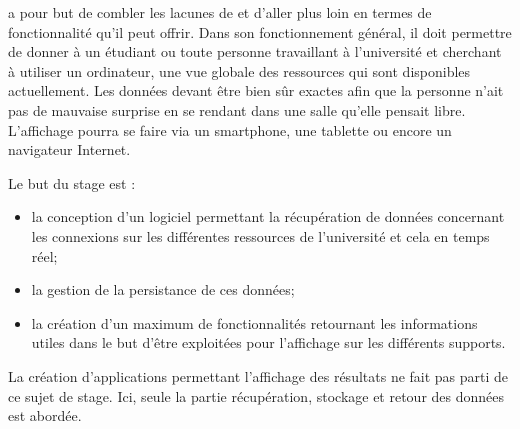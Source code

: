 \YuukouII{} a pour but de combler les lacunes de \Yuukou{} et d'aller plus loin en termes de fonctionnalit\'e qu'il peut offrir. 
Dans son fonctionnement g\'en\'eral, il doit permettre de donner \`a un \'etudiant ou toute personne travaillant \`a l'universit\'e et cherchant \`a utiliser un ordinateur, une vue globale des ressources qui sont disponibles actuellement.
Les donn\'ees devant \^etre bien s\^ur exactes afin que la personne n'ait pas de mauvaise surprise en se rendant dans une salle qu'elle pensait libre.
L'affichage pourra se faire via un smartphone, une tablette ou encore un navigateur Internet.

\noindent Le but du stage est : 
\begin{itemize}
	\item la conception d'un logiciel permettant la r\'ecup\'eration de donn\'ees concernant les connexions sur les diff\'erentes ressources de l'universit\'e et cela en temps r\'eel;
	\item la gestion de la persistance de ces donn\'ees;
	\item la cr\'eation d'un maximum de fonctionnalit\'es retournant les informations utiles dans le but d'\^etre exploit\'ees pour l'affichage sur les diff\'erents supports.

\end{itemize} 

La cr\'eation d'applications permettant l'affichage des r\'esultats ne fait pas parti de ce sujet de stage. 
Ici, seule la partie r\'ecup\'eration, stockage et retour des donn\'ees est abord\'ee.

\clearpage
